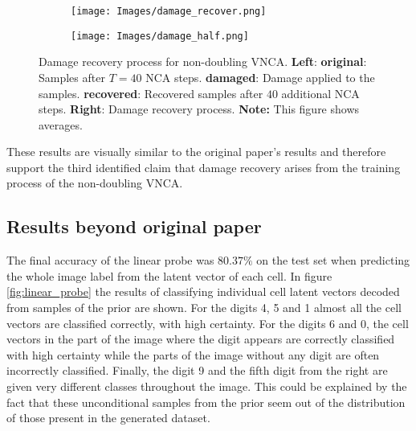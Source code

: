 \begin{figure}[ht]
    \begin{subfigure}{.6\textwidth}
        \centering
        \texttt{[image: Images/damage\_recover.png]}
        \label{fig:damage_recover}
    \end{subfigure}
    \begin{subfigure}{.4\textwidth}
        \centering
        \texttt{[image: Images/damage\_half.png]}
        \label{fig:damage_half}
    \end{subfigure}
\caption{Damage recovery process for non-doubling VNCA. \textbf{Left}: \textbf{original}: Samples after $T=40$ NCA steps. \textbf{damaged}: Damage applied to the samples. \textbf{recovered}: Recovered samples after $40$ additional NCA steps. \textbf{Right}: Damage recovery process. %
\textbf{Note:} This figure shows averages.}
\label{fig:damage}
\end{figure}

These results are visually similar to the original paper's results and therefore support the third identified claim that damage recovery arises from the training process of the non-doubling VNCA.


\subsection{Results beyond original paper}

The final accuracy of the linear probe was $80.37\%$ on the test set when predicting the whole image label from the latent vector of each cell. In figure \ref{fig:linear_probe} the results of classifying individual cell latent vectors decoded from samples of the prior are shown. For the digits 4, 5 and 1 almost all the cell vectors are classified correctly, with high certainty. For the digits 6 and 0, the cell vectors in the part of the image where the digit appears are correctly classified with high certainty while the parts of the image without any digit are often incorrectly classified. Finally, the digit 9 and the fifth digit from the right are given very different classes throughout the image. This could be explained by the fact that these unconditional samples from the prior seem out of the distribution of those present in the generated dataset.



